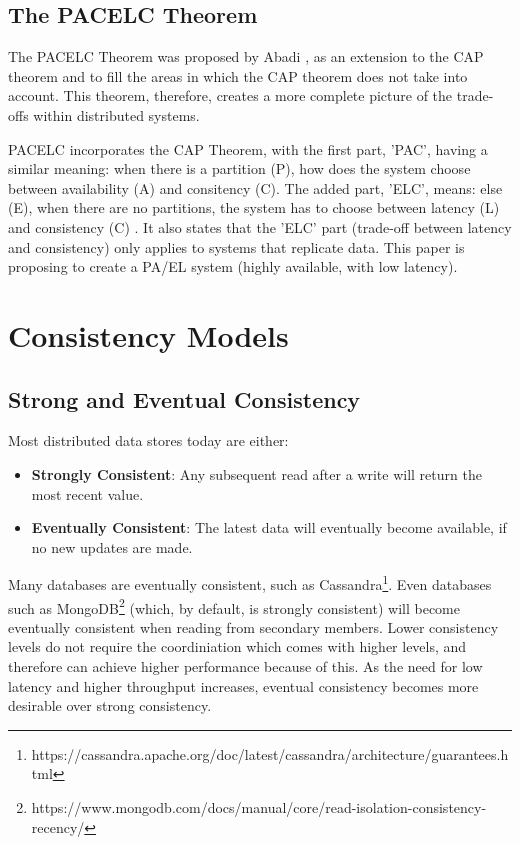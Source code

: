 \documentclass[12pt]{report}
\begin{document}
\subsection{The PACELC Theorem}
The PACELC Theorem was proposed by Abadi \cite{6127847}, as an extension to the CAP theorem and to fill the areas in which the CAP theorem does not take into account. This theorem, therefore, creates a more complete picture of the trade-offs within distributed systems. \par
PACELC incorporates the CAP Theorem, with the first part, 'PAC', having a similar meaning: when there is a partition (P), how does the system choose between availability (A) and consitency (C). The added part, 'ELC', means: else (E), when there are no partitions, the system has to choose between latency (L) and consistency (C) \cite{6127847}. It also states that the 'ELC' part (trade-off between latency and consistency) only applies to systems that replicate data. This paper is proposing to create a PA/EL \cite{6127847} system (highly available, with low latency).

\section{Consistency Models}
\subsection{Strong and Eventual Consistency}
Most distributed data stores today are either:
\begin{itemize}
    \item \textbf{Strongly Consistent}: Any subsequent read after a write will return the most recent value.
    \item \textbf{Eventually Consistent}: The latest data will eventually become available, if no new updates are made.
\end{itemize}
Many databases are eventually consistent, such as Cassandra\footnote{https://cassandra.apache.org/doc/latest/cassandra/architecture/guarantees.html}. Even databases such as MongoDB\footnote{https://www.mongodb.com/docs/manual/core/read-isolation-consistency-recency/} (which, by default, is strongly consistent) will become eventually consistent when reading from secondary members. Lower consistency levels do not require the coordiniation which comes with higher levels, and therefore can achieve higher performance because of this. As the need for low latency and higher throughput increases, eventual consistency becomes more desirable over strong consistency. \par
\end{document}
